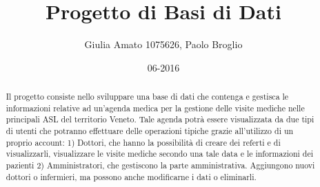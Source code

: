 \documentclass[a4paper,11pt]{report}
\begin{document}
\title{Progetto di Basi di Dati}
\author{Giulia Amato 1075626, Paolo Broglio}
\date{06-2016}

\maketitle


\begin{abstract}
Il progetto consiste nello sviluppare una base di dati che contenga e gestisca le informazioni relative ad un'agenda medica per la gestione delle visite mediche nelle principali ASL del territorio Veneto. Tale agenda potrà essere visualizzata da due tipi di utenti che potranno effettuare delle operazioni tipiche grazie all'utilizzo di un proprio account:
1) Dottori, che hanno la possibilità di creare dei referti e di visualizzarli, visualizzare le visite mediche secondo una tale data e le informazioni dei pazienti
2) Amministratori, che gestiscono la parte amministrativa. Aggiungono nuovi dottori o infermieri, ma possono anche modificarne i dati o eliminarli.

\end{abstract}
\end{document}
